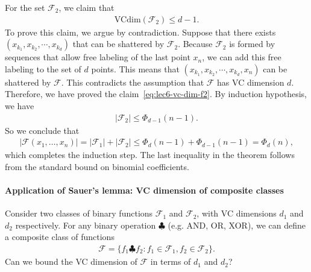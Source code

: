 \documentclass[11pt,letterpaper]{article}
\numberwithin{theorem}{lecture}
\numberwithin{proposition}{lecture}
\numberwithin{lemma}{lecture}
\numberwithin{claim}{lecture}
\numberwithin{corollary}{lecture}
\numberwithin{definition}{lecture}
\numberwithin{conjecture}{lecture}
\numberwithin{remark}{lecture}
\numberwithin{example}{lecture}
\numberwithin{equation}{lecture}
\begin{document}
For the set $\mathcal{F}_2$, we claim that
\begin{align}
  \text{VCdim} (\mathcal{F}_2) \leq d - 1.\label{eq:lec6-vc-dim-f2}
\end{align}
To prove this claim, we argue by contradiction. Suppose that there exists $(x_{k_1}, x_{k_2}, \cdots, x_{k_d})$ that can be shattered by $\mathcal{F}_2$. Because $\mathcal{F}_2$ is formed by sequences that allow free labeling of the last point $x_n$, we can add this free labeling to the set of $d$ points. This means that $(x_{k_1}, x_{k_2}, \cdots, x_{k_d}, x_n)$ can be shattered by $\mathcal{F}$. This contradicts the assumption that $\mathcal{F}$ has VC dimension $d$. Therefore, we have proved the claim~\eqref{eq:lec6-vc-dim-f2}. By induction hypothesis, we have
\begin{align*}
  |\mathcal{F}_2| \leq \Phi_{d - 1} (n - 1).
\end{align*}
So we conclude that
\begin{align*}
  |\mathcal{F} (x_1, \ldots, x_n)| = |\mathcal{F}_1 | + |\mathcal{F}_2 | \leq \Phi_d (n - 1) + \Phi_{d - 1} (n - 1) = \Phi_d (n),
\end{align*}
which completes the induction step. The last inequality in the theorem follows from the standard bound on binomial coefficients.



\paragraph{Application of Sauer's lemma: VC dimension of composite classes} Consider two classes of binary functions $\mathcal{F}_1$ and $\mathcal{F}_2$, with VC dimensions $d_1$ and $d_2$ respectively. For any binary operation $\clubsuit$ (e.g. AND, OR, XOR), we can define a composite class of functions
\begin{align*}
  \mathcal{F} = \{f_1 \clubsuit f_2: f_1 \in \mathcal{F}_1, f_2 \in \mathcal{F}_2\}.
\end{align*}
Can we bound the VC dimension of $\mathcal{F}$ in terms of $d_1$ and $d_2$?
\end{document}
